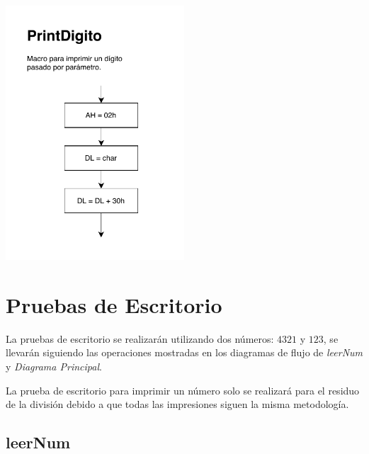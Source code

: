 \documentclass[letter,12 pt,titlepage]{article}
\begin{document}
    \begin{center}
    \includegraphics[width=0.5\textwidth]{img/diagramas/p01-PrintDigito}
    \end{center}

    
    
    

    \section{Pruebas de Escritorio}

    La pruebas de escritorio se realizarán utilizando dos números: $4321$ y $123$, se llevarán siguiendo las operaciones mostradas en los diagramas de flujo de \textit{leerNum} y \textit{Diagrama Principal}.

    La prueba de escritorio para imprimir un número solo se realizará para el residuo de la división debido a que todas las impresiones siguen la misma metodología.

    \subsection{leerNum}
\end{document}
